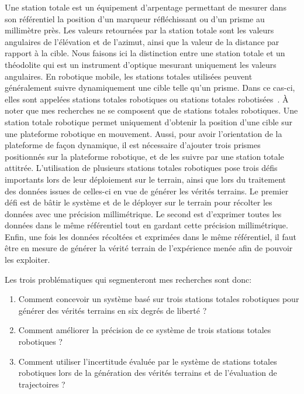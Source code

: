 Une station totale est un équipement d'arpentage permettant de mesurer dans son référentiel la position d'un marqueur réfléchissant ou d'un prisme au millimètre près.
Les valeurs retournées par la station totale sont les valeurs angulaires de l'élévation et de l'azimut, ainsi que la valeur de la distance par rapport à la cible.
Nous faisons ici la distinction entre une station totale et un théodolite qui est un instrument d'optique mesurant uniquement les valeurs angulaires.
En robotique mobile, les stations totales utilisées peuvent généralement suivre dynamiquement une cible telle qu'un prisme.
Dans ce cas-ci, elles sont appelées stations totales robotiques ou stations totales robotisées~\cite{Cheng2011}.
À noter que mes recherches ne se composent que de stations totales robotiques.
Une station totale robotique permet uniquement d'obtenir la position d'une cible sur une plateforme robotique en mouvement.
Aussi, pour avoir l'orientation de la plateforme de façon dynamique, il est nécessaire d'ajouter trois prismes positionnés sur la plateforme robotique, et de les suivre par une station totale attitrée.
L'utilisation de plusieurs stations totales robotiques pose trois défis importants lors de leur déploiement sur le terrain, ainsi que lors du traitement des données issues de celles-ci en vue de générer les vérités terrains.
Le premier défi est de bâtir le système et de le déployer sur le terrain pour récolter les données avec une précision millimétrique.
Le second est d'exprimer toutes les données dans le même référentiel tout en gardant cette précision millimétrique. 
Enfin, une fois les données récoltées et exprimées dans le même référentiel, il faut être en mesure de générer la vérité terrain de l'expérience menée afin de pouvoir les exploiter.

Les trois problématiques qui segmenteront mes recherches sont donc:

\begin{enumerate}\bfseries
  	\item Comment concevoir un système basé sur trois stations totales robotiques pour générer des vérités terrains en six degrés de liberté ?
  	\item Comment améliorer la précision de ce système de trois stations totales robotiques ?
	\item Comment utiliser l'incertitude évaluée par le système de stations totales robotiques lors de la génération des vérités terrains et de l'évaluation de trajectoires ?
\end{enumerate}

